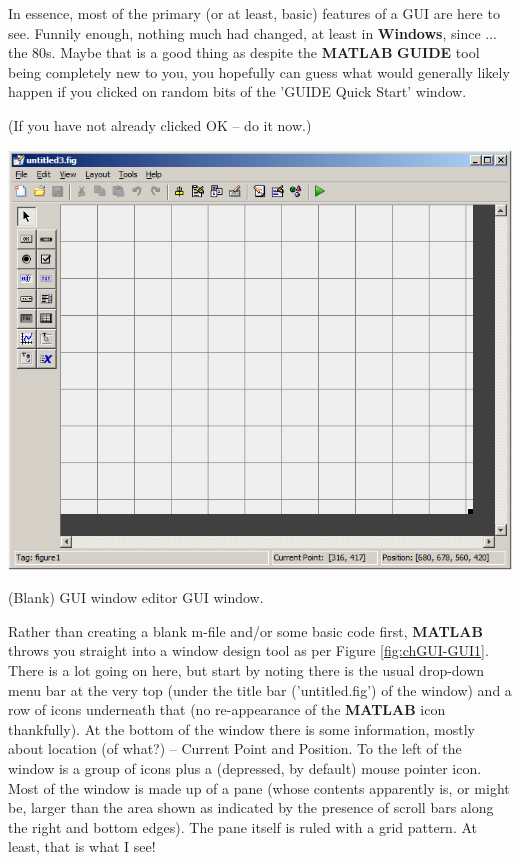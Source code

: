 \documentclass{tufte-book} %
\begin{document}
In essence, most of the primary (or at least, basic) features of a GUI are here to see. Funnily enough, nothing much had changed, at least in \textbf{Windows}, since ... the 80s. Maybe that is a good thing as despite the \textbf{MATLAB} \textbf{GUIDE} tool being completely new to you, you hopefully can guess what would generally likely happen if you clicked on random bits of the '\textsf{GUIDE Quick Start}' window.

(If you have not already clicked \textsf{OK} -- do it now.)

\begin{marginfigure}[0.0in]
\includegraphics[width=\linewidth]{chGUI-GUI1.png}
\caption{(Blank) GUI window editor GUI window.}
\label{fig:chGUI-GUI1}
\end{marginfigure}

Rather than creating a blank \textsf{m-file} and/or some basic code first, \textbf{MATLAB}  throws you straight into a window design tool as per Figure \ref{fig:chGUI-GUI1}. There is a lot going on here, but start by noting there is the usual drop-down menu bar at the very top (under the title bar ('\textsf{untitled.fig}') of the window) and a row of icons underneath that (no re-appearance of the \textbf{MATLAB} icon thankfully). At the bottom of the window there is some information, mostly about location (of what?) -- \textsf{Current Point }and \textsf{Position}. To the left of the window is a group of icons plus a (depressed, by default) mouse pointer icon. Most of the window is made up of a pane (whose contents apparently is, or might be, larger than the area shown as indicated by the presence of scroll bars along the right and bottom edges). The pane itself is ruled with a grid pattern. At least, that is what I see!
\end{document}
